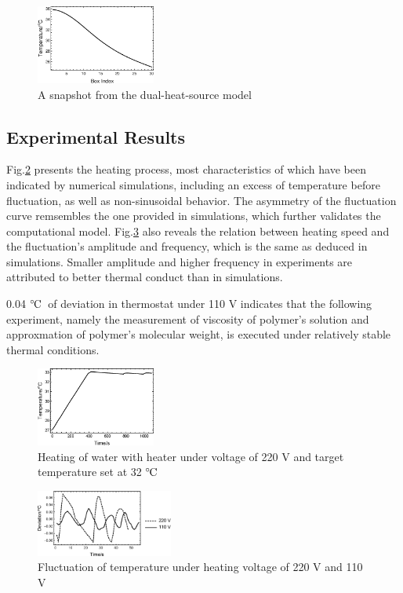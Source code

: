 \documentclass[%
 reprint,
 amsmath,amssymb,
 aps,
]{revtex4-1}
\newcommand{\celsius}{\ensuremath{^\circ\hspace{-0.09em}\mathrm{C}}}
\begin{document}
\begin{figure}
\centering
\includegraphics[width=0.35\textwidth]{figures/dualheatsnapshot.eps}
\caption{A snapshot from the dual-heat-source model}
\label{dualsnapshot}
\end{figure}

\subsection{Experimental Results}
Fig.\ref{heating} presents the heating process, most characteristics of which have been indicated by numerical simulations, including an excess of temperature before fluctuation, as well as non-sinusoidal behavior. The asymmetry of the fluctuation curve remsembles the one provided in simulations, which further validates the computational model. Fig.\ref{volt} also reveals the relation between heating speed and the fluctuation's amplitude and frequency, which is the same as deduced in simulations. Smaller amplitude and higher frequency in experiments are attributed to better thermal conduct than in simulations. 

0.04 \celsius~of deviation in thermostat under 110 V indicates that the following experiment, namely the measurement of viscosity of polymer's solution and approxmation of polymer's molecular weight, is executed under relatively stable thermal conditions.
\begin{figure}
\centering
\includegraphics[width=0.35\textwidth]{figures/Heating.eps}
\caption{Heating of water with heater under voltage of 220 V and target temperature set at 32 \celsius}
\label{heating}
\end{figure}

\begin{figure}
\centering
\includegraphics[width=0.4\textwidth]{figures/DifVoltDeviation.eps}
\caption{Fluctuation of temperature under heating voltage of 220 V and 110 V}
\label{volt}
\end{figure}
\end{document}
